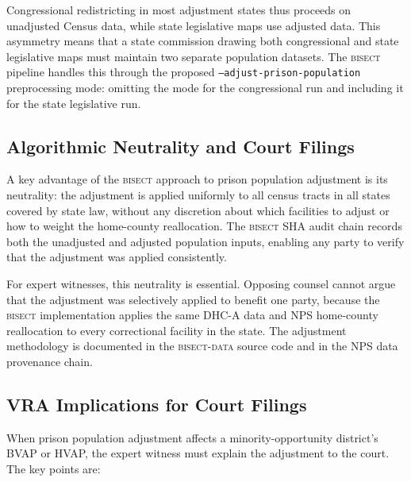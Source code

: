 Congressional redistricting in most adjustment states thus proceeds on
unadjusted Census data, while state legislative maps use adjusted data.
This asymmetry means that a state commission drawing both congressional
and state legislative maps must maintain two separate population datasets.
The \textsc{bisect} pipeline handles this through the proposed
\texttt{--adjust-prison-population} preprocessing mode: omitting the mode
for the congressional run and including it for the state legislative run.

\subsection{Algorithmic Neutrality and Court Filings}

A key advantage of the \textsc{bisect} approach to prison population
adjustment is its neutrality: the adjustment is applied uniformly
to all census tracts in all states covered by state law, without any
discretion about which facilities to adjust or how to weight the
home-county reallocation. The \textsc{bisect} SHA audit chain records
both the unadjusted and adjusted population inputs, enabling any
party to verify that the adjustment was applied consistently.

For expert witnesses, this neutrality is essential. Opposing counsel
cannot argue that the adjustment was selectively applied to benefit
one party, because the \textsc{bisect} implementation applies the same
DHC-A data and NPS home-county reallocation to every correctional
facility in the state. The adjustment methodology is documented in the
\textsc{bisect-data} source code and in the NPS data provenance chain.

\subsection{VRA Implications for Court Filings}

When prison population adjustment affects a minority-opportunity district's
BVAP or HVAP, the expert witness must explain the adjustment to the court.
The key points are:

